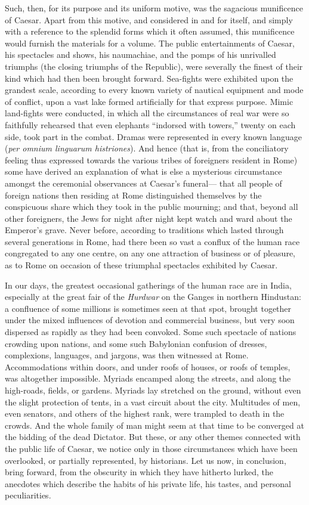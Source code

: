 Such, then, for its purpose and its uniform motive, was the sagacious
munificence of Caesar. Apart from this motive, and considered in and for
itself, and simply with a reference to the splendid forms which it often
assumed, this munificence would furnish the materials for a volume. The
public entertainments of Caesar, his spectacles and shows, his
naumachiae, and the pomps of his unrivalled triumphs (the closing
triumphs of the Republic), were severally the finest of their kind which
had then been brought forward. Sea-fights were exhibited upon the
grandest scale, according to every known variety of nautical equipment
and mode of conflict, upon a vast lake formed artificially for that
express purpose. Mimic land-fights were conducted, in which all the
circumstances of real war were so faithfully rehearsed that even
elephants ``indorsed with towers,'' twenty on each side, took part in the
combat. Dramas were represented in every known language (\emph{per omnium
linguarum histriones}). And hence (that is, from the conciliatory
feeling thus expressed towards the various tribes of foreigners resident
in Rome) some have derived an explanation of what is else a mysterious
circumstance amongst the ceremonial observances at Caesar's funeral—
that all people of foreign nations then residing at Rome distinguished
themselves by the conspicuous share which they took in the public
mourning; and that, beyond all other foreigners, the Jews for night
after night kept watch and ward about the Emperor's grave. Never before,
according to traditions which lasted through several generations in
Rome, had there been so vast a conflux of the human race congregated to
any one centre, on any one attraction of business or of pleasure, as to
Rome on occasion of these triumphal spectacles exhibited by Caesar.

In our days, the greatest occasional gatherings of the human race are in
India, especially at the great fair of the \emph{Hurdwar} on the Ganges in
northern Hindustan: a confluence of some millions is sometimes seen at
that spot, brought together under the mixed influences of devotion and
commercial business, but very soon dispersed as rapidly as they had been
convoked. Some such spectacle of nations crowding upon nations, and some
such Babylonian confusion of dresses, complexions, languages, and
jargons, was then witnessed at Rome. Accommodations within doors, and
under roofs of houses, or roofs of temples, was altogether impossible.
Myriads encamped along the streets, and along the high-roads, fields, or
gardens. Myriads lay stretched on the ground, without even the slight
protection of tents, in a vast circuit about the city. Multitudes of
men, even senators, and others of the highest rank, were trampled to
death in the crowds. And the whole family of man might seem at that time
to be converged at the bidding of the dead Dictator. But these, or any
other themes connected with the public life of Caesar, we notice only in
those circumstances which have been overlooked, or partially
represented, by historians. Let us now, in conclusion, bring forward,
from the obscurity in which they have hitherto lurked, the anecdotes
which describe the habits of his private life, his tastes, and personal
peculiarities.

